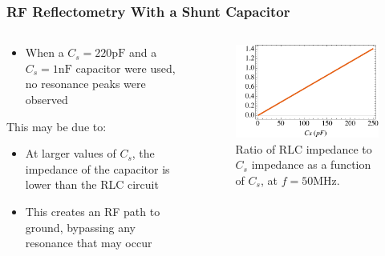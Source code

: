 \documentclass{beamer}
\begin{document}
\begin{frame}
    \frametitle{RF Reflectometry With a Shunt Capacitor}


    \begin{columns}
        \begin{column}{0.5\textwidth}
            \begin{itemize}
                \item When a $C_s = 220\si{\pico\farad}$ and a $C_s = 1\si{\nano\farad}$ capacitor were used, no resonance peaks were observed
            \end{itemize}
            This may be due to:
            \begin{itemize}
                \item At larger values of $C_s$, the impedance of the capacitor is lower than the RLC circuit
                \item This creates an RF path to ground, bypassing any resonance that may occur
            \end{itemize}
        \end{column}
        \begin{column}{0.5\textwidth}
            \begin{figure}
                \centering
                \includegraphics[width=\textwidth]{impedanceratio.pdf}
                \caption{Ratio of RLC impedance to $C_s$ impedance as a function of $C_s$, at $f=50\si{\mega\hertz}$.}
                \label{fig:impedanceratio}
            \end{figure}
        \end{column}
    \end{columns}


\end{frame}
\end{document}
